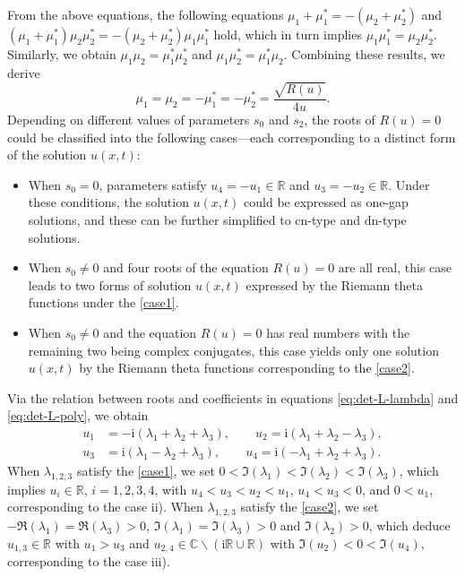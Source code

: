 \documentclass[11pt,reqno]{amsart}
\newcommand{\ii}{\mathrm{i}}
\newcommand{\cn}{\mathrm{cn}}
\newcommand{\dn}{\mathrm{dn}}
\numberwithin{equation}{section}
\begin{document}
From the above equations, the following equations $\mu_1+\mu_1^*=-(\mu_2+\mu_2^*)$ and $(\mu_1+\mu_1^*)\mu_2\mu_2^*=-(\mu_2+\mu_2^*)\mu_1\mu_1^*$ hold,
which in turn implies $\mu_1\mu_1^*=\mu_2\mu_2^*$. 
Similarly, we obtain $\mu_1\mu_2=\mu_1^*\mu_2^*$ and $\mu_1\mu_2^*=\mu_1^*\mu_2$. 
Combining these results, we derive
\begin{equation}\label{eq:define-R-u-mu}
	\mu_1=\mu_2=-\mu_1^*=-\mu_2^*=\frac{\sqrt{R(u)}}{4u}. 
\end{equation}
Depending on different values of parameters $s_0$ and $s_2$, the roots of $R(u)=0$ could be classified into the following cases---each corresponding to a distinct form of the solution $u(x,t)$:
\begin{itemize}
	\item[i)] When $s_0=0$, parameters satisfy $u_4=-u_1\in \mathbb{R}$ and $u_3=-u_2 \in \mathbb{R}$. 
	Under these conditions, the solution $u(x,t)$ could be expressed as one-gap solutions, and these can be further simplified to $\cn$-type and $\dn$-type solutions. 
	\item[ii)] When $s_0 \neq 0$ and
	four roots of the equation $R(u)=0$ are all real, this case leads to two forms of solution $u(x,t)$ expressed by the Riemann theta functions under the \ref{case1}.
	\item[iii)] When $s_0 \neq 0$ and the equation $R(u)=0$ has real numbers with the remaining two being complex conjugates, this case yields only one solution $u(x,t)$ by the Riemann theta functions corresponding to the \ref{case2}.
\end{itemize}

Via the relation between roots and coefficients in equations \eqref{eq:det-L-lambda} and \eqref{eq:det-L-poly}, we obtain
\begin{equation}\label{eq:define-u-lambda}
	\begin{split}
		u_1&=-\ii(\lambda_1+\lambda_2+\lambda_3), \qquad
		u_2=\ii(\lambda_1+\lambda_2-\lambda_3), \\
		u_3&=\ii(\lambda_1-\lambda_2+\lambda_3),	\qquad
		u_4=\ii(-\lambda_1+\lambda_2+\lambda_3).
	\end{split}
\end{equation}
When $\lambda_{1,2,3}$ satisfy the \ref{case1},  we set $0<\Im(\lambda_1)<\Im(\lambda_2)<\Im(\lambda_3)$, which implies $u_i\in \mathbb{R}$, $i=1,2,3,4$, with $u_4<u_3<u_2<u_1$, $u_4<u_3<0$, and $0<u_1$, corresponding to the case ii).
When $\lambda_{1,2,3}$ satisfy the \ref{case2}, we set $-\Re(\lambda_1)=\Re(\lambda_3)>0$, $\Im(\lambda_1)=\Im(\lambda_3)>0$ and $\Im(\lambda_2)>0$, which deduce $u_{1,3}\in \mathbb{R}$ with $u_1>u_3$ and $u_{2,4}\in \mathbb{C}\backslash(\ii \mathbb{R}\cup\mathbb{R})$ with $\Im(u_2)<0<\Im(u_4)$, corresponding to the case iii).
\end{document}
